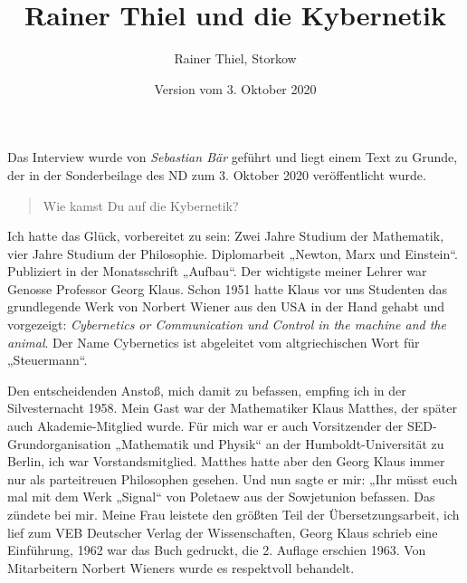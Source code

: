 \documentclass[11pt,a4paper]{article}
\title{Rainer Thiel und die Kybernetik}
\author{Rainer Thiel, Storkow}
\date{Version vom 3. Oktober 2020}
\newenvironment{frage}{\begin{quote}}{\end{quote}}
\begin{document}
\maketitle

Das Interview wurde von \emph{Sebastian Bär} geführt und liegt einem Text zu
Grunde, der in der Sonderbeilage des ND zum 3. Oktober 2020 veröffentlicht
wurde.

\begin{frage}
  Wie kamst Du auf die Kybernetik?
\end{frage}
Ich hatte das Glück, vorbereitet zu sein: Zwei Jahre Studium der Mathematik,
vier Jahre Studium der Philosophie. Diplomarbeit „Newton, Marx und Einstein“.
Publiziert in der Monatsschrift „Aufbau“. Der wichtigste meiner Lehrer war
Genosse Professor Georg Klaus. Schon 1951 hatte Klaus vor uns Studenten das
grundlegende Werk von Norbert Wiener aus den USA in der Hand gehabt und
vorgezeigt: \emph{Cybernetics or Communication und Control in the machine and
  the animal}. Der Name Cybernetics ist abgeleitet vom altgriechischen Wort
für „Steuermann“.

Den entscheidenden Anstoß, mich damit zu befassen, empfing ich in der
Silvesternacht 1958. Mein Gast war der Mathematiker Klaus Matthes, der später
auch Akademie-Mitglied wurde. Für mich war er auch Vorsitzender der
SED-Grundorganisation „Mathematik und Physik“ an der Humboldt-Universität zu
Berlin, ich war Vorstandsmitglied. Matthes hatte aber den Georg Klaus immer
nur als parteitreuen Philosophen gesehen. Und nun sagte er mir: „Ihr müsst
euch mal mit dem Werk „Signal“ von Poletaew aus der Sowjetunion befassen. Das
zündete bei mir. Meine Frau leistete den größten Teil der Übersetzungsarbeit,
ich lief zum VEB Deutscher Verlag der Wissenschaften, Georg Klaus schrieb eine
Einführung, 1962 war das Buch gedruckt, die 2. Auflage erschien 1963. Von
Mitarbeitern Norbert Wieners wurde es respektvoll behandelt.
\end{document}
